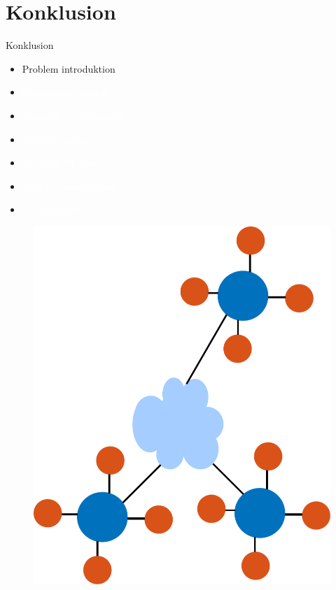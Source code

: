 \section{Konklusion}
\begin{frame}{Konklusion}
	\begin{minipage}{0.5\textwidth}
		\begin{itemize}
		\item Problem introduktion
		\item[] \textcolor{white} {Eksisterende modeller}
		\item[] \textcolor{white} {Parameter bestemmelse}
		\item[] \textcolor{white} {Databehandling}
		\item[] \textcolor{white} {Foreslået PL model}
		\item[] \textcolor{white} {Model sammenligning}
		\item[] \textcolor{white} {z parameteren}
		\end{itemize}
	\end{minipage}%
	\begin{minipage}{0.5\textwidth}
		\begin{figure}[H]
			\centering
			\includegraphics[width=\columnwidth]{figures/wsn_ill.pdf}
		\end{figure}
	\end{minipage}%
\end{frame}

